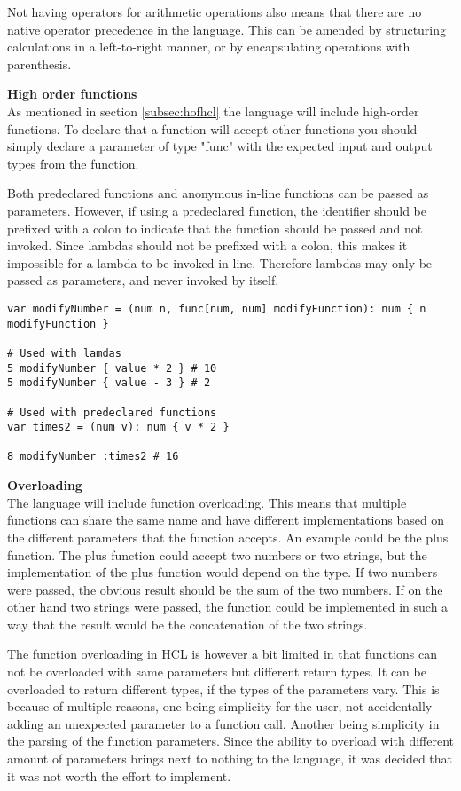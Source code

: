 Not having operators for arithmetic operations also means that there are no native operator precedence in the language.
This can be amended by structuring calculations in a left-to-right manner, or by encapsulating operations with parenthesis. 

\textbf{High order functions}\\
As mentioned in section \ref{subsec:hofhcl} the language will include high-order functions. To declare that a function will accept other functions you should simply declare a parameter of type "func" with the expected input and output types from the function.

Both predeclared functions and anonymous in-line functions can be passed as parameters. However, if using a predeclared function, the identifier should be prefixed with a colon to indicate that the function should be passed and not invoked. Since lambdas should not be prefixed with a colon, this makes it impossible for a lambda to be invoked in-line. Therefore lambdas may only be passed as parameters, and never invoked by itself.

\begin{lstlisting}
var modifyNumber = (num n, func[num, num] modifyFunction): num { n modifyFunction }

# Used with lamdas
5 modifyNumber { value * 2 } # 10
5 modifyNumber { value - 3 } # 2

# Used with predeclared functions
var times2 = (num v): num { v * 2 }

8 modifyNumber :times2 # 16

\end{lstlisting}

\textbf{Overloading}\\

The language will include function overloading. 
This means that multiple functions can share the same name and have different implementations based on the different parameters that the function accepts. 
An example could be the plus function. 
The plus function could accept two numbers or two strings, but the implementation of the plus function would depend on the type.
If two numbers were passed, the obvious result should be the sum of the two numbers.
If on the other hand two strings were passed, the function could be implemented in such a way that the result would be the concatenation of the two strings.

The function overloading in HCL is however a bit limited in that functions can not be overloaded with same parameters but different return types. 
It can be overloaded to return different types, if the types of the parameters vary. 
This is because of multiple reasons, one being simplicity for the user, not accidentally adding an unexpected parameter to a function call. 
Another being simplicity in the parsing of the function parameters. 
Since the ability to overload with different amount of parameters brings next to nothing to the language, it was decided that it was not worth the effort to implement.

